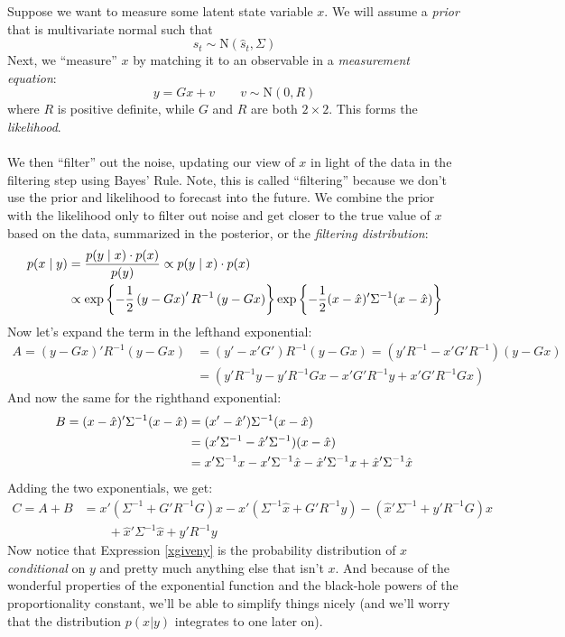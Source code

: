 \documentclass[a4paper,12pt]{article}
\begin{document}
Suppose we want to measure some latent state variable $x$. We will 
assume a \emph{prior} that is multivariate normal such that
    \[ s_t \sim \text{N}(\hat{s}_t, \Sigma) \]
Next, we ``measure'' $x$ by matching it to an observable in
a \emph{measurement equation}:
    \[ y = G x + v \qquad v\sim \text{N}(0, R) \]
where $R$ is positive definite, while $G$ and $R$ are both 
$2 \times 2$. This forms the \emph{likelihood}.
\\
\\
We then ``filter'' out the noise, updating our view of $x$ in
light of the data in the filtering step using Bayes' Rule.
Note, this is called ``filtering'' because we don't use the prior
and likelihood to forecast into
the future. We combine the prior with the likelihood only to filter
out noise and get closer to the true value of $x$ based on
the data, summarized in the posterior, or the
\emph{filtering distribution}:
\begin{align}
    p(x \; | \; y) &= \frac{p(y \; | \; x) \cdot p(x)}{p(y)} 
    \propto p(y \; | \; x) \cdot p(x) \label{xgiveny} \\
    &\propto \exp\left\{-\frac{1}{2}
	\left( y - Gx \right)' R^{-1} \left(y-Gx\right)
	\right\} \exp\left\{-\frac{1}{2}( x - \hat{x} )' 
	\Sigma^{-1} (x-\hat{x})\right\} \notag
\end{align}
Now let's expand the term in the lefthand exponential:
\begin{align*}
    A = \left( y - Gx \right)' R^{-1} \left(y-Gx\right) &= 
	\left( y' - x'G' \right) R^{-1} \left(y-Gx\right) 
    = \left( y'R^{-1} - x'G'R^{-1} \right)  \left(y-Gx\right) \\
    &= \left( y'R^{-1}y - y'R^{-1} Gx - x'G'R^{-1} y 
	+ x'G'R^{-1} Gx\right)
\end{align*}
And now the same for the righthand exponential:
\begin{align}
     B = ( x - \hat{x} )' \Sigma^{-1} (x-\hat{x}) 
	&= ( x' - \hat{x}' ) \Sigma^{-1} (x-\hat{x}) \notag\\
    &=  (x'\Sigma^{-1} - \hat{x}'\Sigma^{-1})   
	(x-\hat{x}) \notag \\
    &=  x'\Sigma^{-1} x - x'\Sigma^{-1} \hat{x} - 
	\hat{x}'\Sigma^{-1} x
	+ \hat{x}'\Sigma^{-1} \hat{x} \label{B}
\end{align}
Adding the two exponentials, we get:
\begin{align*}
    C = A + B &= x' \left( \Sigma^{-1} + G'R^{-1}G\right) x 
	- x' (\Sigma^{-1} \hat{x} + G'R^{-1}y)
	- (\hat{x}' \Sigma^{-1} + y' R^{-1}G) x  \\
	& \qquad + \hat{x}' \Sigma^{-1} \hat{x} + y' R^{-1} y 
\end{align*}
Now notice that Expression \ref{xgiveny} is the probability
distribution of $x$ \emph{conditional} on $y$ and pretty
much anything else that isn't $x$.  And because of the
wonderful properties of the exponential function and the
black-hole powers of the proportionality constant, we'll be
able to simplify things nicely (and we'll worry that the
distribution $p(x|y)$ integrates to one later on).  
\end{document}
